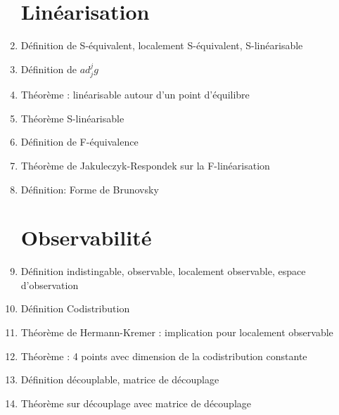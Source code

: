 \documentclass{article}
\begin{document}
\begin{enumerate}
\section{Linéarisation}
	\item Définition de S-équivalent, localement S-équivalent, S-linéarisable
	\item Définition de $ad_j^jg$
	\item Théorème : linéarisable autour d'un point d'équilibre
	\item Théorème S-linéarisable
	\item Définition de F-équivalence
	\item Théorème de Jakuleczyk-Respondek sur la F-linéarisation
	\item Définition: Forme de Brunovsky
\section{Observabilité}
	\item Définition indistingable, observable, localement observable, espace d'observation
	\item Définition Codistribution
	\item Théorème de Hermann-Kremer : implication pour localement observable
	\item Théorème : 4 points avec dimension de la codistribution constante
	\item Définition découplable, matrice de découplage
	\item Théorème sur découplage avec matrice de découplage
\end{enumerate}
\end{document}
